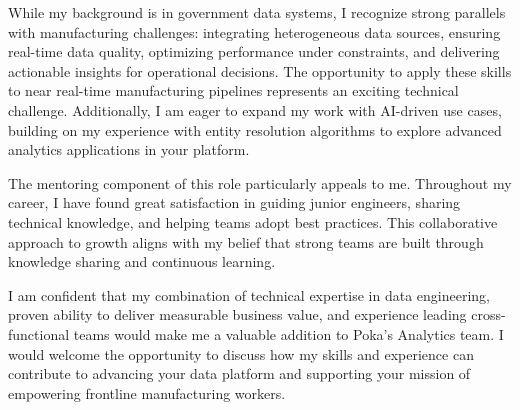 \begin{storedcvletter}
{While my background is in government data systems, I recognize strong parallels with manufacturing challenges: integrating heterogeneous data sources, ensuring real-time data quality, optimizing performance under constraints, and delivering actionable insights for operational decisions. The opportunity to apply these skills to near real-time manufacturing pipelines represents an exciting technical challenge. Additionally, I am eager to expand my work with AI-driven use cases, building on my experience with entity resolution algorithms to explore advanced analytics applications in your platform.

The mentoring component of this role particularly appeals to me. Throughout my career, I have found great satisfaction in guiding junior engineers, sharing technical knowledge, and helping teams adopt best practices. This collaborative approach to growth aligns with my belief that strong teams are built through knowledge sharing and continuous learning.

I am confident that my combination of technical expertise in data engineering, proven ability to deliver measurable business value, and experience leading cross-functional teams would make me a valuable addition to Poka's Analytics team. I would welcome the opportunity to discuss how my skills and experience can contribute to advancing your data platform and supporting your mission of empowering frontline manufacturing workers.
}
\end{storedcvletter}

